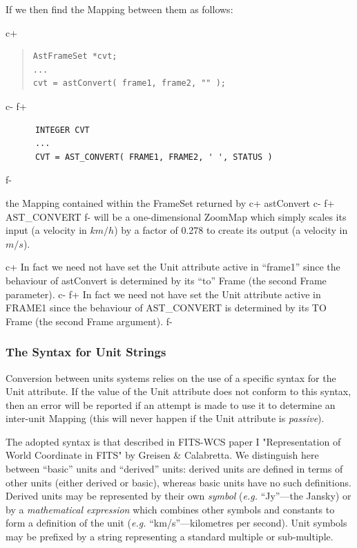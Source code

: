 \documentclass[twoside,11pt]{article}
\begin{document}
If we then find the Mapping between them as follows:

c+
\begin{quote}
\small
\begin{verbatim}
AstFrameSet *cvt;
...
cvt = astConvert( frame1, frame2, "" );
\end{verbatim}
\normalsize
\end{quote}
c-
f+
\small
\begin{verbatim}
      INTEGER CVT
      ...
      CVT = AST_CONVERT( FRAME1, FRAME2, ' ', STATUS )
\end{verbatim}
\normalsize
f-

the Mapping contained within the FrameSet returned by
c+
astConvert
c-
f+
AST\_CONVERT
f-
will be a one-dimensional ZoomMap which simply scales its input (a
velocity in $km/h$) by a factor of 0.278 to create its output (a velocity
in $m/s$).

c+
In fact we need not have set the Unit attribute active in ``frame1''
since the behaviour of astConvert is determined by its ``to'' Frame
(the second Frame parameter).
c-
f+
In fact we need not have set the Unit attribute active in FRAME1
since the behaviour of AST\_CONVERT is determined by its TO Frame
(the second Frame argument).
f-

\subsubsection{\label{ss:unitsyntax}The Syntax for Unit Strings}
Conversion between units systems relies on the use of a specific syntax
for the Unit attribute. If the value of the Unit attribute does not
conform to this syntax, then an error will be reported if an attempt is
made to use it to determine an inter-unit Mapping (this will never happen
if the Unit attribute is \emph{passive}).

The adopted syntax is that described in FITS-WCS paper I "Representation
of World Coordinate in FITS" by Greisen \& Calabretta. We distinguish
here between ``basic'' units and ``derived'' units: derived units are
defined in terms of other units (either derived or basic), whereas basic
units have no such definitions. Derived units may be represented by their
own \emph{symbol} (\emph{e.g.} ``Jy''---the Jansky) or by a
\emph{mathematical expression} which combines other symbols and constants
to form a definition of the unit (\emph{e.g.} ``km/s''---kilometres per
second). Unit symbols may be prefixed by a string representing a standard 
multiple or sub-multiple.
\end{document}
